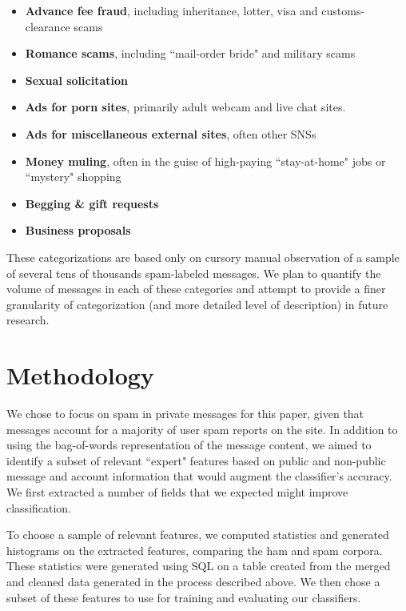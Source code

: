 \documentclass[preprint]{acm_proc_article-sp}
\begin{document}
\begin{itemize}
\item \textbf{Advance fee fraud}, including inheritance, lotter, visa and customs-clearance scams
\item \textbf{Romance scams}, including ``mail-order bride" and military scams
\item \textbf{Sexual solicitation}
\item \textbf{Ads for porn sites}, primarily adult webcam and live chat sites.
\item \textbf{Ads for miscellaneous external sites}, often other SNSs
\item \textbf{Money muling}, often in the guise of high-paying ``stay-at-home" jobs or ``mystery" shopping
\item \textbf{Begging \& gift requests}
\item \textbf{Business proposals}
\end{itemize}

These categorizations are based only on cursory manual observation of a sample of several tens of thousands 
spam-labeled messages. We plan to quantify the volume of messages in each of these categories and 
attempt to provide a finer granularity of categorization (and more detailed level of description) in 
future research. 


\section{Methodology}

We chose to focus on spam in private messages for this paper, given that messages account for 
a majority of user spam reports on the site. In addition to using the bag-of-words representation of 
the message content, we aimed to identify a subset of relevant ``expert" features 
based on public and non-public message and account information that would augment the classifier's 
accuracy. We first extracted a number of fields that we expected might improve classification. 

To choose a sample of relevant features, we computed statistics and generated histograms on 
the extracted features, comparing the ham and spam corpora. These statistics were generated 
using SQL on a table created from the merged and cleaned data generated in the process described 
above. We then chose a subset of these features to use for training and evaluating our classifiers.
\end{document}
